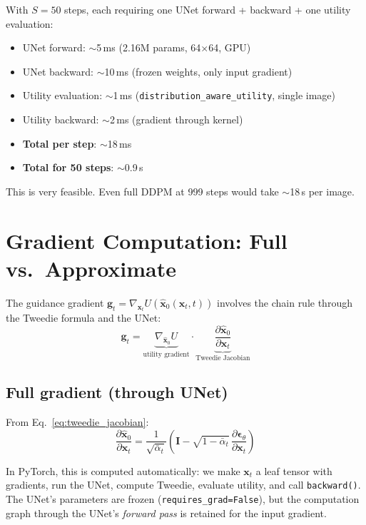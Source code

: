 \documentclass[11pt]{article}
\newcommand{\xb}{\mathbf{x}}
\newcommand{\eb}{\boldsymbol{\epsilon}}
\newcommand{\gb}{\mathbf{g}}
\newcommand{\Ib}{\mathbf{I}}
\newcommand{\alphabar}{\bar{\alpha}}
\begin{document}
With $S = 50$ steps, each requiring one UNet forward + backward + one utility evaluation:
\begin{itemize}[nosep]
    \item UNet forward: $\sim$5\,ms (2.16M params, 64$\times$64, GPU)
    \item UNet backward: $\sim$10\,ms (frozen weights, only input gradient)
    \item Utility evaluation: $\sim$1\,ms (\texttt{distribution\_aware\_utility}, single image)
    \item Utility backward: $\sim$2\,ms (gradient through kernel)
    \item \textbf{Total per step}: $\sim$18\,ms
    \item \textbf{Total for 50 steps}: $\sim$0.9\,s
\end{itemize}

This is very feasible. Even full DDPM at 999 steps would take $\sim$18\,s per image.

\section{Gradient Computation: Full vs.\ Approximate}
\label{sec:gradient_approx}

The guidance gradient $\gb_t = \nabla_{\xb_t} U(\hat{\xb}_0(\xb_t, t))$ involves the
chain rule through the Tweedie formula and the UNet:
\begin{equation}
    \gb_t = \underbrace{\nabla_{\hat{\xb}_0} U}_{\text{utility gradient}}
    \cdot
    \underbrace{\frac{\partial \hat{\xb}_0}{\partial \xb_t}}_{\text{Tweedie Jacobian}}
\end{equation}

\subsection{Full gradient (through UNet)}

From Eq.~\eqref{eq:tweedie_jacobian}:
\begin{equation}
    \frac{\partial \hat{\xb}_0}{\partial \xb_t}
    = \frac{1}{\sqrt{\alphabar_t}}
    \left(\Ib - \sqrt{1 - \alphabar_t}\, \frac{\partial \eb_\theta}{\partial \xb_t}\right)
\end{equation}

In PyTorch, this is computed automatically: we make $\xb_t$ a leaf tensor with gradients,
run the UNet, compute Tweedie, evaluate utility, and call \texttt{backward()}.
The UNet's parameters are frozen (\texttt{requires\_grad=False}), but the computation
graph through the UNet's \emph{forward pass} is retained for the input gradient.
\end{document}
